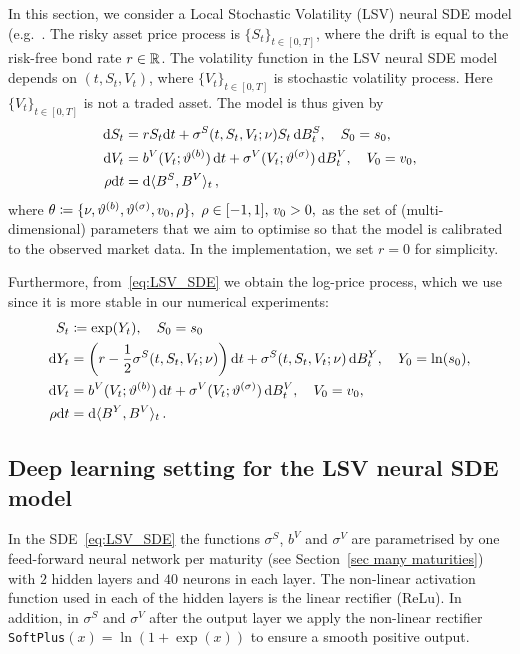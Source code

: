 In this section, we consider a Local Stochastic Volatility (LSV) neural SDE model (e.g.~\cite{Tian2015CalibratingModel}. The risky asset price process is $\{S_t\}_{t\in[0,T]}$, where the drift is equal to the risk-free bond rate $r\in\mathbb{R}$. The volatility function in the LSV neural SDE model
depends on $(t, S_t, V_t)$, where $\{V_t\}_{t\in[0,T]}$ is stochastic volatility process.
Here $\{V_t\}_{t\in[0,T]}$ is not a traded asset.
The model is thus given by
\begin{align}\label{eq:LSV_SDE}
\begin{split}
\mathrm{d} S_t & = r S_t\mathrm{d} t + \sigma^S(t,S_t, V_t; \nu)S_t \,\mathrm{d} B^S_t, \quad S_0 = s_0,\\
\mathrm{d} V_t & = b^V(V_t; \vartheta^{(b)})\,\mathrm{d} t + \sigma^V(V_t; \vartheta^{(\sigma)}) \,\mathrm{d} B^V_t, \quad V_0 = v_0, \\
\rho\mathrm{d} t & = \mathrm{d}\langle B^S, B^V\rangle_t \,,
\end{split}
\end{align}
where 
$\theta \coloneqq  \{\nu, \vartheta^{(b)}, \vartheta^{(\sigma)}, v_0, \rho \},\,\,\rho\in[-1,1],\,v_0>0, 
$
as the set of (multi-dimensional) parameters that we aim to optimise so that 
the model is calibrated to the observed market data. In the implementation, we set $r=0$ for simplicity.

Furthermore, from~\eqref{eq:LSV_SDE} we obtain the log-price process, which we use since it is more stable in our numerical experiments: 
\begin{align}\label{eq:LSV_SDE_log-price}
\begin{split}
S_t & \coloneqq  \exp(Y_t), \quad S_0=s_0 \\
\mathrm{d} Y_t & = \left(r-\frac{1}{2}\sigma^S(t,S_t,V_t;\nu)\right)\mathrm{d} t + \sigma^S(t,S_t, V_t; \nu) \,\mathrm{d} B^Y_t, \quad Y_0 = \ln(s_0),\\
\mathrm{d} V_t & = b^V(V_t; \vartheta^{(b)})\,\mathrm{d} t + \sigma^V(V_t; \vartheta^{(\sigma)}) \,\mathrm{d} B^V_t, \quad V_0 = v_0, \\
\rho\mathrm{d} t & = \mathrm{d}\langle B^Y, B^V\rangle_t\,. 
\end{split}
\end{align}


\subsection{Deep learning setting for the LSV neural SDE model}\label{sec:LSV_DL_setting}

In the SDE~\eqref{eq:LSV_SDE} the functions $\sigma^S$, $b^V$ and $\sigma^V$ are parametrised by one feed-forward neural 
network per maturity (see Section~\ref{sec many maturities}) with $2$ hidden layers and $40$ neurons in each layer. 
The non-linear activation
function used in each of the hidden layers is the linear rectifier (ReLu). In addition, in $\sigma^S$ and $\sigma^V$
after the output layer we apply the non-linear rectifier \texttt{SoftPlus}$(x)=\ln(1+\exp(x))$ to ensure a smooth positive output. 

